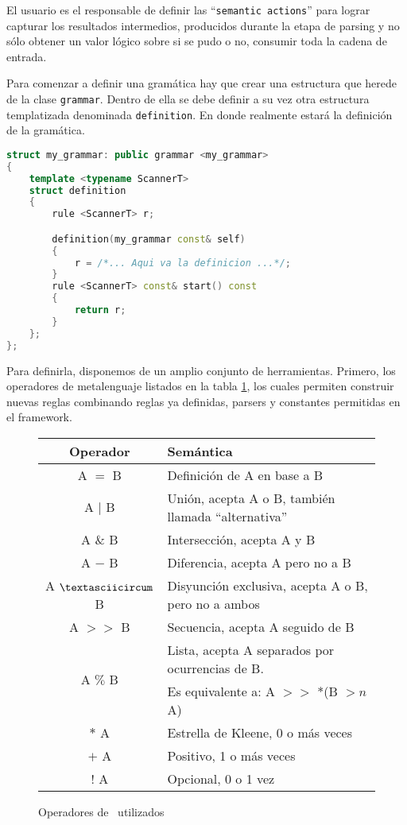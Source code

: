 El usuario es el responsable de definir las ``\texttt{semantic actions}'' para lograr capturar los resultados intermedios, producidos durante la etapa de parsing y no sólo obtener un valor lógico sobre si se pudo o no, consumir toda la cadena de entrada.

Para comenzar a definir una gramática hay que crear una estructura que herede de la clase \texttt{grammar}. Dentro de ella se debe definir a su vez otra estructura templatizada denominada \texttt{definition}. En donde realmente estará la definición de la gramática.

\newpage

\begin{lstlisting}[float, language=C++, basicstyle=\scriptsize, columns=fullflexible, linewidth=8cm]
struct my_grammar: public grammar <my_grammar>
{
    template <typename ScannerT>
    struct definition
    {
        rule <ScannerT> r;

        definition(my_grammar const& self)
        {
            r = /*... Aqui va la definicion ...*/;
        }
        rule <ScannerT> const& start() const
        {
            return r;
        }
    };
};
\end{lstlisting}

Para definirla, disponemos de un amplio conjunto de herramientas. Primero, los operadores de metalenguaje listados en la tabla \ref{ope_spirit}, los cuales permiten construir nuevas reglas combinando reglas ya definidas, parsers y constantes permitidas en el framework.

\begin{figure}[h!]\centering\scriptsize
\begin{tabular}{| c | p{7cm} |}
\hline

\rowcolor{gris} \textbf{Operador} & \textbf{Semántica} \\ \hline

A $=$                  B  & Definición de A en base a B \\ \hline
A $|$                  B  & Unión, acepta A o B, también llamada ``alternativa''\\ \hline
A $\&$                 B  & Intersección, acepta A y B \\ \hline
A $-$                  B  & Diferencia, acepta A pero no a B  \\ \hline
A $\textasciicircum$   B  & Disyunción exclusiva, acepta A o B, pero no a ambos \\ \hline
A $>>$                 B  & Secuencia, acepta A seguido de B \\ \hline
\multirow{2}{*}{A $\%$ B} & Lista, acepta A separados por ocurrencias de B.\\
                          & Es equivalente a: A $>>$ *(B $>n$ A)\\ \hline
$*$                    A  & Estrella de Kleene, 0 o más veces \\ \hline
$+$                    A  & Positivo, 1 o más veces \\ \hline
$!$                    A  & Opcional, 0 o 1 vez \\ \hline
\end{tabular}
\caption{Operadores de \spirit\ utilizados}\label{ope_spirit}
\end{figure}

